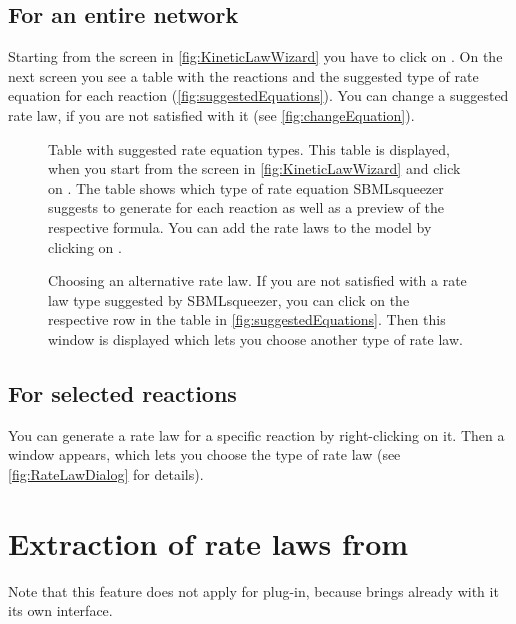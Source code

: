 \subsection{For an entire network}
Starting from the screen in \vref{fig:KineticLawWizard} you have to click on . On the next screen you see a table with the reactions and the suggested type of rate equation for each reaction (\vref{fig:suggestedEquations}). You can change a suggested rate law, if you are not satisfied with it (see \vref{fig:changeEquation}).

\begin{figure}[htbp]
\caption[Table with suggested rate equation types]{Table with suggested rate equation types.
This table is displayed, when you start from the screen in \vref{fig:KineticLawWizard} and click on . The table shows which type of rate equation SBMLsqueezer suggests to generate for each reaction as well as a preview of the respective formula. You can add the rate laws to the model by clicking on .}
\label{fig:suggestedEquations}
\end{figure}

\begin{figure}
\caption[Choosing an alternative rate law]{Choosing an alternative rate law.
If you are not satisfied with a rate law type suggested by SBMLsqueezer, you can click on the respective row in the table in \vref{fig:suggestedEquations}. Then this window is displayed which lets you choose another type of rate law.}
\label{fig:changeEquation}
\end{figure}

\subsection{For selected reactions}
You can generate a rate law for a specific reaction by right-clicking on it. Then a window appears, which lets you choose the type of rate law (see \vref{fig:RateLawDialog} for details).


\section{Extraction of rate laws from \SABIO}

Note that this feature does not apply for \CellDesigner plug-in,
because \CellDesigner brings already with it its own \SABIO interface.

